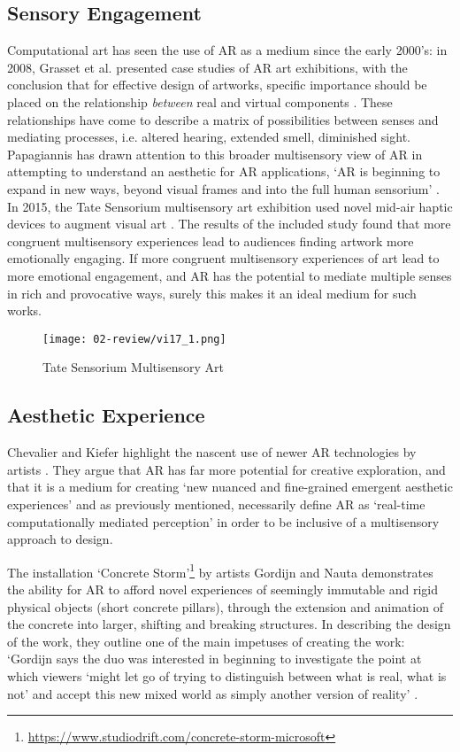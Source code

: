 \subsection{Sensory Engagement}\label{sec: ar-arts-sensory}
Computational art has seen the use of AR as a medium since the early 2000’s: in 2008, Grasset et al. presented case studies of AR art exhibitions, with the conclusion that for effective design of artworks, specific importance should be placed on the relationship \textit{between} real and virtual components \citeyearpar{grasset2008}. These relationships have come to describe a matrix of possibilities between senses and mediating processes, i.e. altered hearing, extended smell, diminished sight. Papagiannis has drawn attention to this broader multisensory view of AR in attempting to understand an aesthetic for AR applications, `AR is beginning to expand in new ways, beyond visual frames and into the full human sensorium' \citeyearpar{papagiannis2014}. In 2015, the Tate Sensorium multisensory art exhibition used novel mid-air haptic devices to augment visual art \citep{vi2017a}. The results of the included study found that more congruent multisensory experiences lead to audiences finding artwork more emotionally engaging. If more congruent multisensory experiences of art lead to more emotional engagement, and AR has the potential to mediate multiple senses in rich and provocative ways, surely this makes it an ideal medium for such works. 

\begin{figure}[bth]
    \myfloatalign
    {\texttt{[image: 02-review/vi17\_1.png]}}
    \caption[Tate Sensorium Multisensory Art]{Tate Sensorium Multisensory Art}\label{fig: tate}
\end{figure}

\subsection{Aesthetic Experience}\label{sec: ar-arts-aesthetics}
Chevalier and Kiefer highlight the nascent use of newer AR technologies by artists \citeyearpar{chevalier2020}. They argue that AR has far more potential for creative exploration, and that it is a medium for creating `new nuanced and fine-grained emergent aesthetic experiences' and as previously mentioned, necessarily define AR as `real-time computationally mediated perception' in order to be inclusive of a multisensory approach to design. 

The installation `Concrete Storm'\footnote{\url{https://www.studiodrift.com/concrete-storm-microsoft}} by artists Gordijn and Nauta demonstrates the ability for AR to afford novel experiences of seemingly immutable and rigid physical objects (short concrete pillars), through the extension and animation of the concrete into larger, shifting and breaking structures. In describing the design of the work, they outline one of the main impetuses of creating the work: `Gordijn says the duo was interested in beginning to investigate the point at which viewers `might let go of trying to distinguish between what is real, what is not' and accept this new mixed world as simply another version of reality' \citep{gottschalk2017}. 

